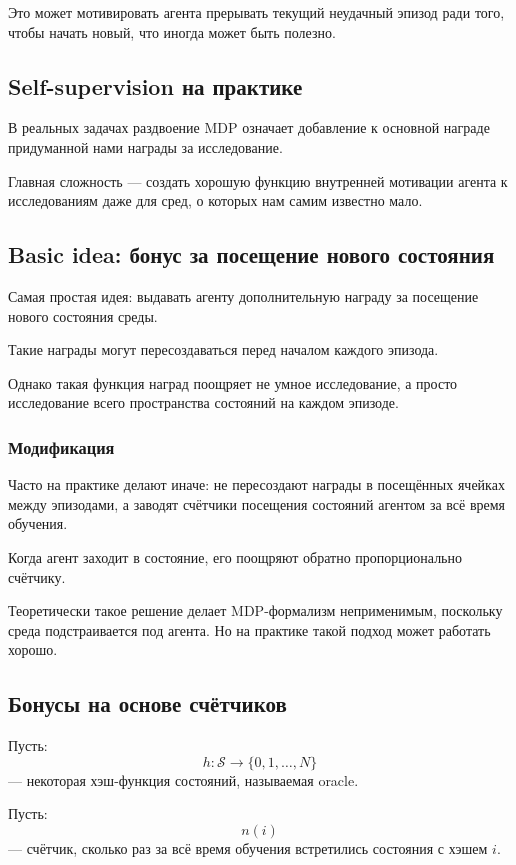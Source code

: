 \documentclass[12pt,a4paper]{article}
\begin{document}
Это может мотивировать агента прерывать текущий неудачный эпизод ради того, чтобы начать новый, что иногда может быть полезно.

\subsection{Self-supervision на практике}

В реальных задачах раздвоение MDP означает добавление к основной награде придуманной нами награды за исследование.

Главная сложность --- создать хорошую функцию внутренней мотивации агента к исследованиям даже для сред, о которых нам самим известно мало.

\subsection{Basic idea: бонус за посещение нового состояния}

Самая простая идея: выдавать агенту дополнительную награду за посещение нового состояния среды.

Такие награды могут пересоздаваться перед началом каждого эпизода.

Однако такая функция наград поощряет не умное исследование, а просто исследование всего пространства состояний на каждом эпизоде.

\subsubsection{Модификация}

Часто на практике делают иначе: не пересоздают награды в посещённых ячейках между эпизодами, а заводят счётчики посещения состояний агентом за всё время обучения.

Когда агент заходит в состояние, его поощряют обратно пропорционально счётчику.

Теоретически такое решение делает MDP-формализм неприменимым, поскольку среда подстраивается под агента. Но на практике такой подход может работать хорошо.

\subsection{Бонусы на основе счётчиков}

Пусть:
\[
h:\mathcal S\to\{0,1,\ldots,N\}
\]
--- некоторая хэш-функция состояний, называемая oracle.

Пусть:
\[
n(i)
\]
--- счётчик, сколько раз за всё время обучения встретились состояния с хэшем $i$.
\end{document}
